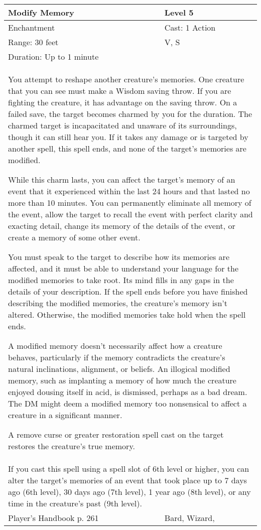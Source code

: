 \documentclass[11pt]{report}
\begin{document}
\begin{table}[H]
	\begin{tabular}{||p{6cm}|p{6cm}||}
		\hline\hline
		\bf{Modify Memory} & Level 5\\ \hline
		Enchantment & Cast: 1 Action\\ \hline
		Range: 30 feet & V, S\\ \hline
		Duration: Up to 1 minute & \\ \hline
		\multicolumn{2}{||p{12cm}||}{You attempt to reshape another creature’s memories.
One creature that you can see must make a Wisdom saving throw. If you are fighting the creature, it has advantage on the saving throw. On a failed save, the target becomes charmed by you for the duration. The charmed target is incapacitated and unaware of its surroundings, though it can still hear you. If it takes any damage or is targeted by another spell, this spell ends, and none of the target’s memories are modified.

While this charm lasts, you can affect the target’s memory of an event that it experienced within the last 24 hours and that lasted no more than 10 minutes. You can permanently eliminate all memory of the event, allow the target to recall the event with perfect clarity and exacting detail, change its memory of the details of the event, or create a memory of some other event.

You must speak to the target to describe how its memories are affected, and it must be able to understand your language for the modified memories to take root. Its mind fills in any gaps in the details of your description. If the spell ends before you have finished describing the modified memories, the creature’s memory isn’t altered. Otherwise, the modified memories take hold when the spell ends.

A modified memory doesn’t necessarily affect how a creature behaves, particularly if the memory contradicts the creature’s natural inclinations, alignment, or beliefs. An illogical modified memory, such as implanting a memory of how much the creature enjoyed dousing itself in acid, is dismissed, perhaps as a bad dream. The DM might deem a modified memory too nonsensical to affect a creature in a significant manner.

A remove curse or greater restoration spell cast on the target restores the creature’s true memory.}\\ \hline
		\multicolumn{2}{||p{12cm}||}{If you cast this spell using a spell slot of 6th level or higher, you can alter the target’s memories of an event that took place up to 7 days ago (6th level), 30 days ago (7th level), 1 year ago (8th level), or any time in the creature’s past (9th level).}\\ \hline
Player's Handbook p. 261 & Bard, Wizard, \\ \hline\hline
	\end{tabular}
\end{table}
\end{document}
